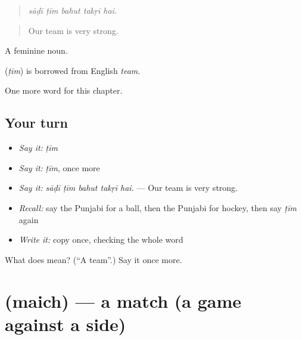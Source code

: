 \begin{quote}
    
\end{quote}

\begin{quote}
\emph{sāḍī ṭīm bahut takṛī hai.}
\end{quote}

\begin{quote}
Our team is very strong.
\end{quote}

A feminine noun.

\begin{cousinweb}
\textbf{} (\emph{ṭīm}) is borrowed from English \emph{team}.
\end{cousinweb}

\begin{grammarlens}[title={What you've built}]
One more word for this chapter.
\end{grammarlens}

\subsection*{Your turn}
\begin{itemize}
\raggedright
  \item \emph{Say it:} \emph{ṭīm}
  \item \emph{Say it:} \emph{ṭīm}, once more
  \item \emph{Say it:} \emph{sāḍī ṭīm bahut takṛī hai.} — Our team is very strong.
  \item \emph{Recall:} say the Punjabi for a ball, then the Punjabi for hockey, then say \emph{ṭīm} again
  \item \emph{Write it:} copy \textbf{} once, checking the whole word
\end{itemize}

\begin{tcolorbox}[breakable,colback=teal!4,colframe=teal!35!black,title={Before you move on}]
What does  mean? (\textquotedblleft{}A team\textquotedblright{}.) Say it once more.
\end{tcolorbox}
\section[\texorpdfstring{\pa{ਮੈਚ} (maich)}{ਮੈਚ (maich)}]{ (maich) — a match (a game against a side)}

\label{lesson:PA-C351-maich}



